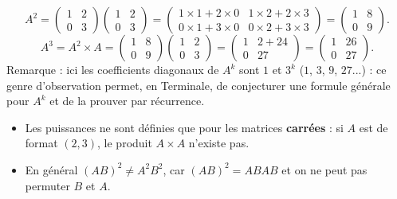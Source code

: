 \documentclass[11pt]{article}
\begin{document}
\begin{exemplebox}[Calcul de $A^2$ et $A^3$ pour $A = \begin{pmatrix} 1 & 2 \\ 0 & 3 \end{pmatrix}$]
\[ A^2 = \begin{pmatrix} 1 & 2 \\ 0 & 3 \end{pmatrix}\begin{pmatrix} 1 & 2 \\ 0 & 3 \end{pmatrix} = \begin{pmatrix} 1\times 1 + 2\times 0 & 1\times 2 + 2\times 3 \\ 0\times 1 + 3\times 0 & 0\times 2 + 3\times 3 \end{pmatrix} = \begin{pmatrix} 1 & 8 \\ 0 & 9 \end{pmatrix}. \]
\[ A^3 = A^2 \times A = \begin{pmatrix} 1 & 8 \\ 0 & 9 \end{pmatrix}\begin{pmatrix} 1 & 2 \\ 0 & 3 \end{pmatrix} = \begin{pmatrix} 1 & 2+24 \\ 0 & 27 \end{pmatrix} = \begin{pmatrix} 1 & 26 \\ 0 & 27 \end{pmatrix}. \]
Remarque : ici les coefficients diagonaux de $A^k$ sont $1$ et $3^k$ ($1$, $3$, $9$, $27$...) : ce genre d'observation permet, en Terminale, de conjecturer une formule générale pour $A^k$ et de la prouver par récurrence.
\end{exemplebox}

\begin{attention}
\begin{itemize}
\item Les puissances ne sont définies que pour les matrices \textbf{carrées} : si $A$ est de format $(2,3)$, le produit $A\times A$ n'existe pas.
\item En général $(AB)^2 \neq A^2 B^2$, car $(AB)^2 = ABAB$ et on ne peut pas permuter $B$ et $A$.
\end{itemize}
\end{attention}
\end{document}
